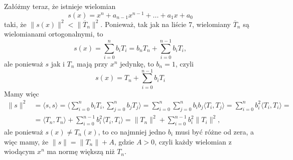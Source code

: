 \documentclass{article}[16pt]
\begin{document}
Załóżmy teraz, że istnieje wielomian
$$s(x)=x^n+a_{n-1}x^{n-1}+...+a_1x+a_0$$
taki, że $\|s(x)\|^2<\|\overline T_n\|^2$. Ponieważ, tak jak na liście 7, wielomiany $\overline T_n$ są wielomianami ortogonalnymi, to
$$s(x)=\sum\limits_{i=0}^nb_iT_i=b_nT_n+\sum\limits_{i=0}^{n-1}b_iT_i,$$
ale ponieważ $s$ jak i $T_n$ mają przy $x^n$ jedynkę, to $b_n=1$, czyli
$$s(x)=T_n+\sum\limits_{i=0}^{n-1}b_iT_i$$
Mamy więc
\begin{align*}
    \|s\|^2&=\langle s,s\rangle=\langle\sum\limits_{i=0}^nb_iT_i,\sum\limits_{j=0}^nb_jT_j\rangle=\sum\limits_{i=0}^n\sum\limits_{j=0}^nb_ib_j\langle T_i,T_j\rangle=\sum\limits_{i=0}^nb_i^2\langle T_i,T_i\rangle=\\
    &=\langle T_n,T_n\rangle+\sum\limits_{i=0}^{n-1}b_i^2\langle T_i,T_i\rangle=\|T_n\|^2+\sum\limits_{i=0}^{n-1}b_i^2\|T_i\|^2,
\end{align*}
ale ponieważ $s(x)\neq T_n(x)$, to co najmniej jedno $b_i$ musi być różne od zera, a więc mamy, że $\|s\|=\|T_n\|+A$, gdzie $A>0$, czyli każdy wielomian z wiodącym $x^n$ ma normę większą niż $T_n$.
\end{document}
